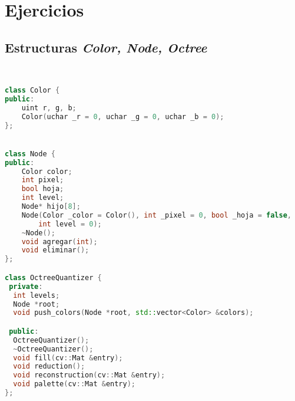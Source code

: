 \section{Ejercicios}
\subsection{Estructuras \textit{Color, Node, Octree}}
\\
\begin{lstlisting}[language=C++,
                   directivestyle={\color{black}}
                   emph={int,char,double,float,unsigned},
                   emphstyle={\color{blue}}
                  ]
class Color {
public:
    uint r, g, b;
    Color(uchar _r = 0, uchar _g = 0, uchar _b = 0);
};


class Node {
public:
    Color color;
    int pixel;
    bool hoja;
    int level;
    Node* hijo[8];
    Node(Color _color = Color(), int _pixel = 0, bool _hoja = false,
        int level = 0);
    ~Node();
    void agregar(int);
    void eliminar();
};

class OctreeQuantizer {
 private:
  int levels;
  Node *root;
  void push_colors(Node *root, std::vector<Color> &colors);

 public:
  OctreeQuantizer();
  ~OctreeQuantizer();
  void fill(cv::Mat &entry);
  void reduction();
  void reconstruction(cv::Mat &entry);
  void palette(cv::Mat &entry);
};
\end{lstlisting}


\iffalse

Como se muestra en la figura \ref{fig:act-3}
\begin{figure}[H]
  \centering
  \texttt{[image: act-3]}
  \caption{Tabla de subneteo para la red 192.168.100.0.}
  \label{fig:act-3}
\end{figure}

\fi